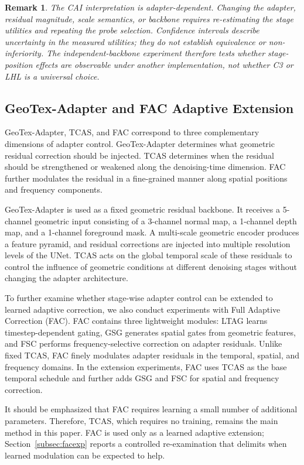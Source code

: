 \documentclass[times,twocolumn,final]{elsarticle}
\newtheorem{remark}{Remark}
\begin{document}
\begin{remark}
The CAI interpretation is adapter-dependent. Changing the adapter, residual magnitude, scale semantics, or backbone requires re-estimating the stage utilities and repeating the probe selection. Confidence intervals describe uncertainty in the measured utilities; they do not establish equivalence or non-inferiority. The independent-backbone experiment therefore tests whether stage-position effects are observable under another implementation, not whether C3 or LHL is a universal choice.
\end{remark}

\subsection{GeoTex-Adapter and FAC Adaptive Extension}
\label{subsec:fac}

GeoTex-Adapter, TCAS, and FAC correspond to three complementary dimensions of adapter control. GeoTex-Adapter determines what geometric residual correction should be injected. TCAS determines when the residual should be strengthened or weakened along the denoising-time dimension. FAC further modulates the residual in a fine-grained manner along spatial positions and frequency components.

GeoTex-Adapter is used as a fixed geometric residual backbone. It receives a 5-channel geometric input consisting of a 3-channel normal map, a 1-channel depth map, and a 1-channel foreground mask. A multi-scale geometric encoder produces a feature pyramid, and residual corrections are injected into multiple resolution levels of the UNet. TCAS acts on the global temporal scale of these residuals to control the influence of geometric conditions at different denoising stages without changing the adapter architecture.

To further examine whether stage-wise adapter control can be extended to learned adaptive correction, we also conduct experiments with Full Adaptive Correction (FAC). FAC contains three lightweight modules: LTAG learns timestep-dependent gating, GSG generates spatial gates from geometric features, and FSC performs frequency-selective correction on adapter residuals. Unlike fixed TCAS, FAC finely modulates adapter residuals in the temporal, spatial, and frequency domains. In the extension experiments, FAC uses TCAS as the base temporal schedule and further adds GSG and FSC for spatial and frequency correction.

It should be emphasized that FAC requires learning a small number of additional parameters. Therefore, TCAS, which requires no training, remains the main method in this paper. FAC is used only as a learned adaptive extension; Section~\ref{subsec:facexp} reports a controlled re-examination that delimits when learned modulation can be expected to help.
\end{document}
